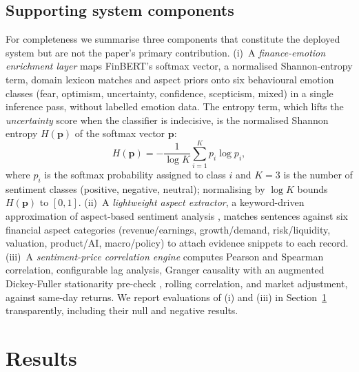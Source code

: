 \documentclass{aims}
\numberwithin{equation}{section}
\begin{document}
\subsection{Supporting system components}\label{sec:supporting}
For completeness we summarise three components that constitute the deployed system
but are not the paper's primary contribution. (i)~A \emph{finance-emotion enrichment
layer} maps FinBERT's softmax vector, a normalised Shannon-entropy term, domain
lexicon matches and aspect priors onto six behavioural emotion classes (fear,
optimism, uncertainty, confidence, scepticism, mixed) in a single inference pass,
without labelled emotion data. The entropy term, which lifts the
\emph{uncertainty} score when the classifier is indecisive, is the normalised
Shannon entropy $H(\mathbf{p})$ of the softmax vector $\mathbf{p}$:
\begin{equation*}
H(\mathbf{p}) = -\frac{1}{\log K}\sum_{i=1}^{K} p_i \log p_i,
\end{equation*}
where $p_i$ is the softmax probability assigned to class $i$ and $K = 3$ is the
number of sentiment classes (positive, negative, neutral); normalising by $\log K$
bounds $H(\mathbf{p})$ to $[0,1]$.
(ii)~A \emph{lightweight aspect extractor}, a keyword-driven approximation of
aspect-based sentiment analysis \citep{pontiki2014}, matches sentences against six
financial aspect categories (revenue/earnings, growth/demand, risk/liquidity,
valuation, product/AI, macro/policy) to attach evidence snippets to each record. (iii)~A
\emph{sentiment-price correlation engine} computes Pearson and Spearman
correlation, configurable lag analysis, Granger causality \citep{granger1969} with
an augmented Dickey-Fuller stationarity pre-check \citep{dickey1979}, rolling
correlation, and market adjustment, against same-day returns. We report evaluations
of (i) and (iii) in Section~\ref{sec:results} transparently, including their null
and negative results.

\section{Results}\label{sec:results}
\end{document}
